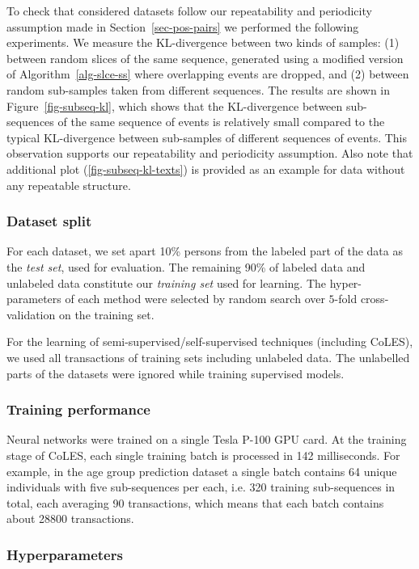 \documentclass[sigconf, anonymous]{acmart}
\begin{document}
To check that considered datasets follow our repeatability and periodicity assumption
made in Section~\ref{sec-pos-pairs}
we performed the following experiments. We measure the KL-divergence between two kinds
of samples:
(1) between random slices of the same sequence, generated using a modified version of
Algorithm~\ref{alg-slce-ss} where overlapping events are dropped, and
(2) between random sub-samples taken from different sequences. The results are shown in
Figure~\ref{fig-subseq-kl}, which shows that the KL-divergence between sub-sequences of
the same sequence of events is relatively small compared to the typical KL-divergence between
sub-samples of different sequences of events. This observation supports our repeatability
and periodicity assumption.
Also note that additional plot (\ref{fig-subseq-kl-texts}) is provided as an example for
data without any repeatable structure.

\subsubsection{Dataset split}

For each dataset, we set apart 10\% persons from the labeled part of the data as
the \emph{test set}, used for evaluation. The remaining 90\% of labeled data and
unlabeled data constitute our \emph{training set} used for learning. The hyper-parameters
of each method were selected by random search over $5$-fold cross-validation on
the training set.

For the learning of semi-supervised/self-supervised techniques (including CoLES),
we used all transactions of training sets including unlabeled data. The unlabelled
parts of the datasets were ignored while training supervised models.

\subsubsection{Training performance}

Neural networks were trained on a single Tesla P-100 GPU card. At the training
stage of CoLES, each single training batch is processed in 142 milliseconds. For example,
in the age group prediction dataset a single batch contains 64 unique individuals with
five sub-sequences per each, i.e. 320 training sub-sequences in total, each averaging
90 transactions, which means that each batch contains about 28800 transactions.

\subsubsection{Hyperparameters}
\end{document}
